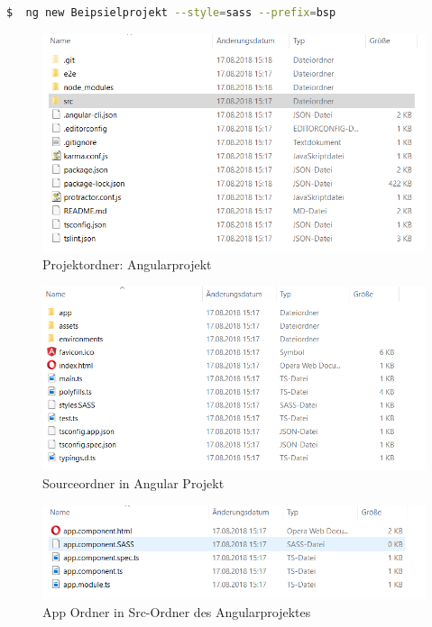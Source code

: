 \begin{lstlisting}[language=sh, frame=single]
$  ng new Beipsielprojekt --style=sass --prefix=bsp
\end{lstlisting} 


\begin{figure}[H]
	\centering
	
	\includegraphics[scale=0.9]{content/pictures/projektordner.png}
	\caption{ Projektordner: Angularprojekt}
	\label{fig:projektfolder}
\end{figure}

\begin{figure}[H]
	\centering
	\includegraphics[scale=0.9]{content/pictures/srcfolder.png}
	\caption{ Sourceordner in Angular Projekt}
	\label{fig:scrfolder}
\end{figure}

\begin{figure}[H]
	\centering
	\includegraphics[scale=0.9]{content/pictures/appfolder.png}
	\caption{ App Ordner in Src-Ordner des Angularprojektes}
	\label{fig:appfolder}
\end{figure}


